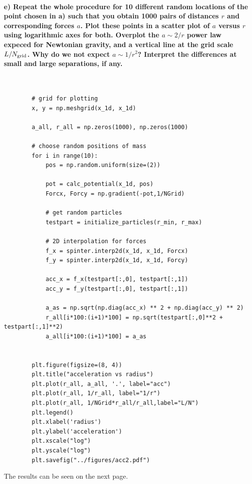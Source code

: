 \newpage
\paragraph{e) Repeat the whole procedure for 10 different random locations of 
    the point chosen in a) such that you obtain 1000 pairs of distances $r$ and 
    corresponding forces $a$. Plot these points in a scatter plot of $a$ versus
    $r$ using logarithmic axes for both. Overplot the $a\sim2/r$ power law 
    expeced for Newtonian gravity, and a vertical line at the grid scale 
    $L/N_\textnormal{grid}$. Why do we not expect $a\sim1/r^2$? Interpret the 
    differences at small and large separations, if any.
} \ \\
    \begin{lstlisting}
        # grid for plotting
        x, y = np.meshgrid(x_1d, x_1d)

        a_all, r_all = np.zeros(1000), np.zeros(1000)

        # choose random positions of mass
        for i in range(10):
            pos = np.random.uniform(size=(2))

            pot = calc_potential(x_1d, pos)
            Forcx, Forcy = np.gradient(-pot,1/NGrid)

            # get random particles
            testpart = initialize_particles(r_min, r_max)

            # 2D interpolation for forces
            f_x = spinter.interp2d(x_1d, x_1d, Forcx)
            f_y = spinter.interp2d(x_1d, x_1d, Forcy)
        
            acc_x = f_x(testpart[:,0], testpart[:,1])
            acc_y = f_y(testpart[:,0], testpart[:,1])

            a_as = np.sqrt(np.diag(acc_x) ** 2 + np.diag(acc_y) ** 2)
            r_all[i*100:(i+1)*100] = np.sqrt(testpart[:,0]**2 + testpart[:,1]**2)
            a_all[i*100:(i+1)*100] = a_as
        

        plt.figure(figsize=(8, 4))
        plt.title("acceleration vs radius")
        plt.plot(r_all, a_all, '.', label="acc")
        plt.plot(r_all, 1/r_all, label="1/r")
        plt.plot(r_all, 1/NGrid*r_all/r_all,label="L/N")
        plt.legend()
        plt.xlabel('radius')
        plt.ylabel('acceleration')
        plt.xscale("log")
        plt.yscale("log")
        plt.savefig("../figures/acc2.pdf")\end{lstlisting}
        The results can be seen on the next page.

